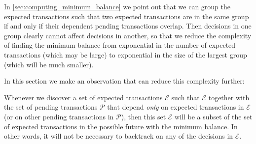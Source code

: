 \documentclass{article}
\theoremstyle{definition}{
  \newtheorem{lemma}{Lemma}[section] %
  \newtheorem{definition}[lemma]{Definition}
}
\theoremstyle{theorem}{
  \newtheorem{invariant}[lemma]{Invariant}
  \newtheorem{proofobligation}[lemma]{Proof Obligation}
}
\numberwithin{equation}{lemma}
\begin{document}
In \cref{sec:computing_minimum_balance} we point out that we can group
the expected transactions such that two expected transactions are in the same
group if and only if their dependent pending transactions overlap. Then
decisions in one group clearly cannot affect decisions in another, so that we
reduce the complexity of finding the minimum balance from exponential in the
number of expected transactions (which may be large) to exponential in the size
of the largest group (which will be much smaller).

In this section we make an observation that can reduce this complexity further:

\begin{lemma}
Whenever we discover a set of expected transactions $\mathcal{E}$ such that
$\mathcal{E}$ together with the set of pending transactions $\mathcal{P}$ that
depend \emph{only} on expected transactions in $\mathcal{E}$ (or on other
pending transactions in $\mathcal{P}$), then this set $\mathcal{E}$ will be a
subset of the set of expected transactions in the possible future with the
minimum balance. In other words, it will not be necessary to backtrack on any of
the decisions in $\mathcal{E}$.
\end{lemma}
\end{document}
